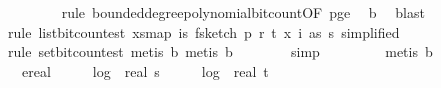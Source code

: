 \begin{isabellebody}
\ \ \ \ \ \ \ \isamarkupfalse%
\ {\isacharparenleft}{\kern0pt}rule\ bounded{\isacharunderscore}{\kern0pt}degree{\isacharunderscore}{\kern0pt}polynomial{\isacharunderscore}{\kern0pt}bit{\isacharunderscore}{\kern0pt}count{\isacharbrackleft}{\kern0pt}OF\ p{\isacharunderscore}{\kern0pt}ge{\isacharunderscore}{\kern0pt}{}{\isacharbrackright}{\kern0pt}{\isacharparenright}{\kern0pt}\ \isamarkupfalse%
\ b{\isacharunderscore}{\kern0pt}{}\ \isamarkupfalse%
\ blast\isanewline
\ \ \ \ \ \ \isamarkupfalse%
\ {\isacharparenleft}{\kern0pt}rule\ list{\isacharunderscore}{\kern0pt}bit{\isacharunderscore}{\kern0pt}count{\isacharunderscore}{\kern0pt}est{\isacharbrackleft}{\kern0pt}\ xs{\isacharequal}{\kern0pt}{\isachardoublequoteopen}map\ {\isacharparenleft}{\kern0pt}{\isasymlambda}i{\isasymin}{\isacharbraceleft}{\kern0pt}{}{\isachardot}{\kern0pt}{\isachardot}{\kern0pt}{\isacharless}{\kern0pt}s{\isacharbraceright}{\kern0pt}{\isachardot}{\kern0pt}\ f{}{\isacharunderscore}{\kern0pt}sketch\ p\ r\ t\ {\isacharparenleft}{\kern0pt}x\ i{\isacharparenright}{\kern0pt}\ as{\isacharparenright}{\kern0pt}\ {\isacharbrackleft}{\kern0pt}{}{\isachardot}{\kern0pt}{\isachardot}{\kern0pt}{\isacharless}{\kern0pt}s{\isacharbrackright}{\kern0pt}{\isachardoublequoteclose}{\isacharcomma}{\kern0pt}\ simplified{\isacharbrackright}{\kern0pt}{\isacharparenright}{\kern0pt}\isanewline
\ \ \ \ \ \ \isamarkupfalse%
\ {\isacharparenleft}{\kern0pt}rule\ set{\isacharunderscore}{\kern0pt}bit{\isacharunderscore}{\kern0pt}count{\isacharunderscore}{\kern0pt}est{\isacharcomma}{\kern0pt}\ metis\ b{\isacharunderscore}{\kern0pt}{}{\isacharcomma}{\kern0pt}\ metis\ b{\isacharunderscore}{\kern0pt}{}{\isacharparenright}{\kern0pt}\isanewline
\ \ \ \ \ \ \isamarkupfalse%
\ simp\ \isanewline
\ \ \ \ \ \ \isamarkupfalse%
\ {\isacharparenleft}{\kern0pt}metis\ b{\isacharunderscore}{\kern0pt}{}{\isacharunderscore}{\kern0pt}{}{\isacharparenright}{\kern0pt}\isanewline
\ \ \ \ \isamarkupfalse%
\ \isamarkupfalse%
\ {\isachardoublequoteopen}{\isachardot}{\kern0pt}{\isachardot}{\kern0pt}{\isachardot}{\kern0pt}\ {\isacharequal}{\kern0pt}\ ereal\ {\isacharparenleft}{\kern0pt}\ {}\ {\isacharplus}{\kern0pt}\ {}\ {\isacharasterisk}{\kern0pt}\ log\ {}\ {\isacharparenleft}{\kern0pt}real\ s\ {\isacharplus}{\kern0pt}\ {}{\isacharparenright}{\kern0pt}\ {\isacharplus}{\kern0pt}\ {}\ {\isacharasterisk}{\kern0pt}\ log\ {}\ {\isacharparenleft}{\kern0pt}real\ t\ {\isacharplus}{\kern0pt}\ {}{\isacharparenright}{\kern0pt}\ {\isacharplus}{\kern0pt}\ \isanewline

\end{isabellebody}
